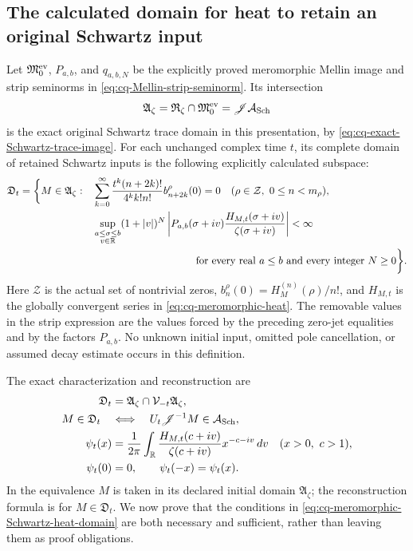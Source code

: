 \subsection{The calculated domain for heat to retain an original Schwartz input}
\label{sec:cq-meromorphic-Schwartz-heat-domain}
Let $\mathfrak M_0^{\rm ev}$, $P_{a,b}$, and $q_{a,b,N}$
be the explicitly proved meromorphic Mellin image and strip
seminorms in \eqref{eq:cq-Mellin-strip-seminorm}. Its intersection
\[
 \mathfrak A_\zeta=\mathfrak R_\zeta\cap\mathfrak M_0^{\rm ev}
                    =\mathscr J\mathcal A_{\rm Sch}
\]
is the exact original Schwartz trace domain in this presentation,
by \eqref{eq:cq-exact-Schwartz-trace-image}. For each unchanged
complex time $t$, its complete domain of retained Schwartz inputs
is the following explicitly calculated subspace:
\begin{equation}\label{eq:cq-meromorphic-Schwartz-heat-domain}
 \begin{aligned}
 \mathfrak D_t=\biggl\{M\in\mathfrak A_\zeta:\quad
 &\sum_{k=0}^{\infty}
       \frac{t^k(n+2k)!}{4^k k!n!}b_{n+2k}^{\rho}(0)=0
       \quad(\rho\in\mathcal Z,\ 0\leq n<m_\rho),\\
 &\sup_{\substack{a\leq\sigma\leq b\\v\in\mathbb R}}
    (1+|v|)^N
    \left|P_{a,b}(\sigma+iv)
       \frac{H_{M,t}(\sigma+iv)}{\zeta(\sigma+iv)}\right|
       <\infty\\
 &\hspace{35mm}\text{for every real }a\leq b
          \text{ and every integer }N\geq0\biggr\}.
 \end{aligned}
\end{equation}
Here $\mathcal Z$ is the actual set of nontrivial zeros,
$b_n^\rho(0)=H_M^{(n)}(\rho)/n!$, and $H_{M,t}$ is the
globally convergent series in \eqref{eq:cq-meromorphic-heat}.
The removable values in the strip expression are the values
forced by the preceding zero-jet equalities and by the factors
$P_{a,b}$. No unknown initial input, omitted pole cancellation,
or assumed decay estimate occurs in this definition.

The exact characterization and reconstruction are
\begin{equation}\label{eq:cq-meromorphic-Schwartz-heat-equivalence}
 \begin{aligned}
 \mathfrak D_t
   &=\mathfrak A_\zeta\cap\mathcal V_{-t}\mathfrak A_\zeta,\\
 M\in\mathfrak D_t\quad&\Longleftrightarrow\quad
 U_t\mathscr J^{-1}M\in\mathcal A_{\rm Sch},\\
 \psi_t(x)
   &=\frac1{2\pi}\int_{\mathbb R}
     \frac{H_{M,t}(c+iv)}{\zeta(c+iv)}x^{-c-iv}\,dv
          \quad(x>0,\ c>1),\\
 \psi_t(0)&=0,\qquad \psi_t(-x)=\psi_t(x).
 \end{aligned}
\end{equation}
In the equivalence $M$ is taken in its declared initial domain
$\mathfrak A_\zeta$; the reconstruction formula is for
$M\in\mathfrak D_t$. We now prove that the conditions in
\eqref{eq:cq-meromorphic-Schwartz-heat-domain} are both necessary
and sufficient, rather than leaving them as proof obligations.

